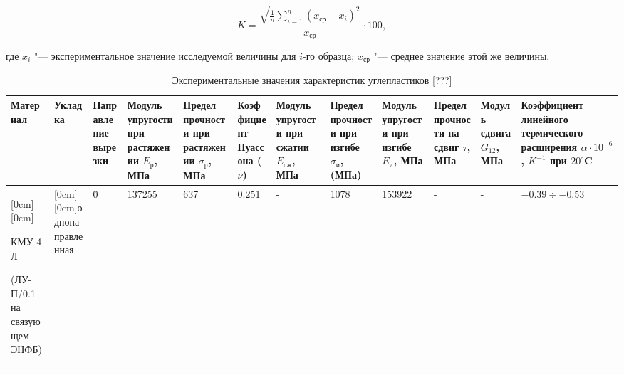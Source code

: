 $$K=\frac{\sqrt{\frac{1}{n}\sum_{i=1}^{n}(x_{\textit{ср}}-x_i)^2}}{x_{\textit{ср}}}\cdot100,$$

где $x_i$ "--- экспериментальное значение исследуемой величины для $i$-го образца; $x_{\textit{ср}}$ "--- среднее значение этой же величины.



\begin{table}[h!]

\centering\footnotesize

\caption{Экспериментальные значения характеристик углепластиков [???]\label{bit:tabl1}}

\vspace{-3mm}

\begin{tabular}[h]{|p{8mm}|p{8mm}|p{6mm}|p{6mm}|p{5mm}|p{8mm}|p{6mm}|p{6mm}|p{8mm}|p{4mm}|p{5mm}|p{20mm}|}%

 \hline 



\tiny Материал & \tiny Укладка & \tiny Направление вырезки & \tiny Модуль упругости при растяжении $E_{\textit{р}}$, МПа & \tiny Предел прочности при растяжении $\sigma _{\textit{р}}$, МПа & \tiny Коэффициент Пуассона ($\nu$) & \tiny Модуль упругости при сжатии $E_{\textit{сж}}$, МПа & \tiny Предел прочности при изгибе $\sigma_{\textit{и}}$, (МПа) & \tiny Модуль упругости при изгибе $E_{\textit{и}}$, МПа & \tiny Предел прочности на сдвиг $\tau$, МПа & \tiny Модуль сдвига $G_{12}$, МПа & \tiny Коэффициент линейного термического расширения $\alpha\cdot10^{-6}$, $K^{-1}$ при $20^\circ$C \\

\hline

\raisebox{-4.50ex}[0cm][0cm]{\tiny КМУ-4Л \par (ЛУ-П/0.1 на связующем ЭНФБ)}& \raisebox{-1.50ex}[0cm][0cm]{\tiny однонаправленная}& \tiny 0\r{ }& \tiny 137255& \tiny 637& \tiny 0.251& -& \tiny 1078& \tiny 153922& -& -& \tiny $-0.39\div-0.53$ \\

\cline{3-12}


\end{tabular}
\end{table}
